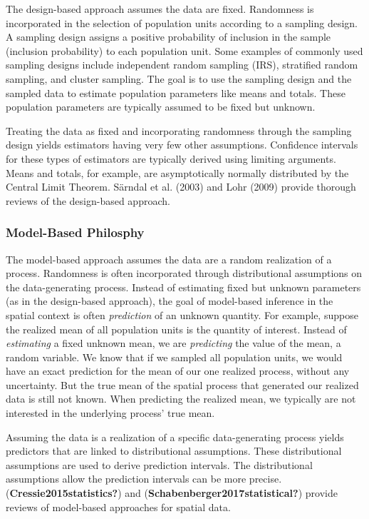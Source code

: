 \documentclass[]{elsarticle} %
\begin{document}
The design-based approach assumes the data are fixed. Randomness is
incorporated in the selection of population units according to a
sampling design. A sampling design assigns a positive probability of
inclusion in the sample (inclusion probability) to each population unit.
Some examples of commonly used sampling designs include independent
random sampling (IRS), stratified random sampling, and cluster sampling.
The goal is to use the sampling design and the sampled data to estimate
population parameters like means and totals. These population parameters
are typically assumed to be fixed but unknown.

Treating the data as fixed and incorporating randomness through the
sampling design yields estimators having very few other assumptions.
Confidence intervals for these types of estimators are typically derived
using limiting arguments. Means and totals, for example, are
asymptotically normally distributed by the Central Limit Theorem.
Särndal et al. (2003) and Lohr (2009) provide thorough reviews of the
design-based approach.

\hypertarget{model-based-philosphy}{%
\subsubsection{Model-Based Philosphy}\label{model-based-philosphy}}

The model-based approach assumes the data are a random realization of a
process. Randomness is often incorporated through distributional
assumptions on the data-generating process. Instead of estimating fixed
but unknown parameters (as in the design-based approach), the goal of
model-based inference in the spatial context is often \emph{prediction}
of an unknown quantity. For example, suppose the realized mean of all
population units is the quantity of interest. Instead of
\emph{estimating} a fixed unknown mean, we are \emph{predicting} the
value of the mean, a random variable. We know that if we sampled all
population units, we would have an exact prediction for the mean of our
one realized process, without any uncertainty. But the true mean of the
spatial process that generated our realized data is still not known.
When predicting the realized mean, we typically are not interested in
the underlying process' true mean.

Assuming the data is a realization of a specific data-generating process
yields predictors that are linked to distributional assumptions. These
distributional assumptions are used to derive prediction intervals. The
distributional assumptions allow the prediction intervals can be more
precise. (\textbf{Cressie2015statistics?}) and
(\textbf{Schabenberger2017statistical?}) provide reviews of model-based
approaches for spatial data.
\end{document}
